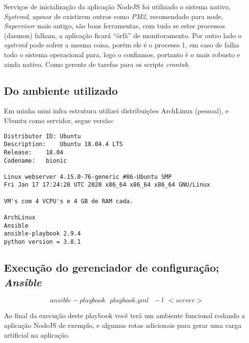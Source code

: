 Serviços de inicialização da aplicação NodeJS foi utilizado o sistema
nativo, \emph{Systemd}, apesar de existirem outros como \emph{PM2},
recomendado para node, \emph{Supervisor} mais antigo, são boas
ferramentas, com tudo se estes processos (daemon) falham, a aplicação ficará
``órfã'' de monitoramento. Por outro lado o \emph{systemd} pode sofrer
a mesma coisa, porém ele é o processo 1, em caso de falha todo o
sistema operacional para, logo o confiamos, portanto é o mais robusto e
ainda nativo. Como gerente de tarefas para os scripts \emph{crontab}.


\subsection{Do ambiente utilizado}
Em minha mini infra estrutura utilizei distribuições ArchLinux (pessoal), e
Ubuntu como servidor, segue versão:

\begin{verbatim}
Distributor ID:	Ubuntu
Description:	Ubuntu 18.04.4 LTS
Release:	18.04
Codename:	bionic

Linux webserver 4.15.0-76-generic #86-Ubuntu SMP
Fri Jan 17 17:24:28 UTC 2020 x86_64 x86_64 x86_64 GNU/Linux

VM's com 4 VCPU's e 4 GB de RAM cada.

ArchLinux
Ansible
ansible-playbook 2.9.4
python version = 3.8.1
\end{verbatim}


\subsection{Execução do gerenciador de configuração; \emph{Ansible}} \label{sec:playbook}
$$ansible-playbook\ \ \ playbook.yml\ \ \ -l\ \ <server>$$

Ao final da execução deste playbook você terá um ambiente funcional
rodando a aplicação NodeJS de exemplo, e algumas rotas adicionais para
gerar uma carga artificial na aplicação.



